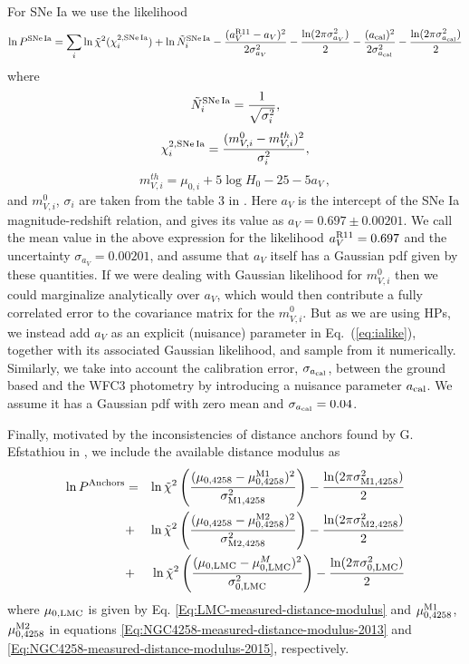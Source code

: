 For SNe Ia we use the likelihood
\begin{equation}
 \ln P^{\mathrm{SNe\,Ia}} = \sum_{i} \ln \tilde{\chi}^{2}(\chi^{2,\mathrm{SNe\,Ia}}_{i}) + \ln \tilde{N}^{\mathrm{SNe\,Ia}}_{i} - \frac{(a^{\rm R11}_V - a_V)^2}{2 \sigma_{a_V}^2} - \frac{\ln (2\pi\sigma_{a_V}^2)}{2} - \frac{(a_{\rm cal})^2}{2 \sigma_{a_{\rm cal}}^2} - \frac{\ln (2\pi\sigma_{a_{\rm cal}}^2)}{2}
 \label{eq:ialike}
\end{equation}
where 
\begin{equation}
\tilde{N}^{\mathrm{SNe\,Ia}}_{i} = \frac{1}{\sqrt{\sigma_{i}^2}},
\end{equation}
\begin{equation}
\chi^{2,\mathrm{SNe\,Ia}}_{i} = \frac{(m^0_{V,i} - m^{th}_{V,i})^2}{\sigma_{i}^2},
\end{equation}
\begin{equation}
m^{th}_{V,i} = \mu_{0,i} + 5 \log H_0 - 25 - 5 a_V \, ,
\end{equation}
and $m^0_{V,i}$, $\sigma_i$ are taken from the table 3 in \cite{Riess:2011yx}. Here $a_V$ is the intercept of the SNe Ia magnitude-redshift relation, and \cite{Riess:2011yx} gives its value as $a_V = 0.697\pm0.00201$. We call the mean value 
in the above expression for the likelihood $a^{\rm R11}_V = 0.697$ and the uncertainty $\sigma_{a_V} = 0.00201$, and assume that $a_V$ itself has a Gaussian pdf given by these quantities. If we were dealing with Gaussian likelihood for $m^0_{V,i}$ then we could marginalize analytically over $a_V$, which would then contribute a fully correlated error to the covariance matrix for the $m^0_{V,i}$. But as we are using HPs, we instead add $a_V$ as an explicit (nuisance) parameter in Eq.\ (\ref{eq:ialike}), together with its associated Gaussian likelihood, and sample from it numerically. Similarly, we take into account the calibration error, $\sigma_{a_{\rm cal}}$, between the ground based and the WFC3 photometry by introducing a nuisance parameter $a_{\rm cal}$. We assume it has a Gaussian pdf with zero mean and $\sigma_{a_{\rm cal}}=0.04$.

Finally, motivated by the inconsistencies of distance anchors found by G. Efstathiou in  \cite{Efstathiou:2013via}, we include the available distance modulus as
\begin{eqnarray}
\ln P^{\mathrm{Anchors}} & = & \ln \tilde{\chi}^{2}\left( \frac{(\mu_{\rm 0,4258} - \mu^{\rm M1}_{\rm 0,4258})^2}{\sigma^2_{\rm M1,4258}}\right) - \frac{\ln (2\pi\sigma_{\rm M1,4258}^2)}{2} \nonumber \\ 
& + & \ln \tilde{\chi}^{2}\left( \frac{(\mu_{\rm 0,4258} - \mu^{\rm M2}_{\rm 0,4258})^2}{\sigma^2_{\rm M2,4258}}\right) - \frac{\ln (2\pi\sigma_{\rm M2,4258}^2)}{2} \nonumber \\
& + & \ln \tilde{\chi}^{2}\left(\frac{(\mu_{0,\mathrm{LMC}} - \mu^M_{0,\mathrm{LMC}})^2}{\sigma^2_{0,\mathrm{LMC}}}\right) - \frac{\ln (2\pi\sigma_{0,\mathrm{LMC}}^2)}{2}
\end{eqnarray}
where $\mu_{0,\mathrm{LMC}}$ is given by Eq. \eqref{Eq:LMC-measured-distance-modulus} and  $\mu^{\rm M1}_{\rm 0,4258}$,  $\mu^{\rm M2}_{\rm 0,4258}$ in equations \eqref{Eq:NGC4258-measured-distance-modulus-2013} and \eqref{Eq:NGC4258-measured-distance-modulus-2015}, respectively.

